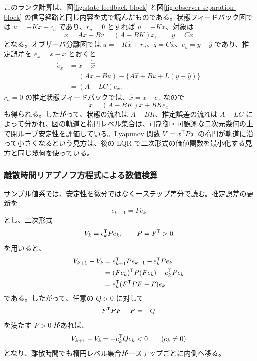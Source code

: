 このランク計算は、図\ref{fig:state-feedback-block} と図\ref{fig:observer-separation-block} の信号経路と同じ内容を式で読んだものである。状態フィードバック図では $u=-Kx+r_u$ であり、$r_u=0$ とすれば $u=-Kx$、対象は
\begin{equation}
  \dot{x}=Ax+Bu=(A-BK)x,\qquad y=Cx
\end{equation}
となる。オブザーバ分離図では $u=-K\hat{x}+r_u$、$\hat{y}=C\hat{x}$、$e_y=y-\hat{y}$ であり、推定誤差を $e_x=x-\hat{x}$ とおくと
\begin{align}
  \dot{e}_x
  &=\dot{x}-\dot{\hat{x}}\\
  &=(Ax+Bu)-\{A\hat{x}+Bu+L(y-\hat{y})\}\\
  &=(A-LC)e_x.
\end{align}
$r_u=0$ の推定状態フィードバックでは、$\hat{x}=x-e_x$ なので
\begin{equation}
  \dot{x}=(A-BK)x+BK e_x
\end{equation}
も得られる。したがって、状態の流れは $A-BK$、推定誤差の流れは $A-LC$ によって分かれ、図の軌道と楕円レベル集合は、可制御・可観測な二次元幾何の上で閉ループ安定性を評価している。Lyapunov 関数 $V=x^{\mathsf{T}} Px$ の楕円が軌道に沿って小さくなるという見方は、後の LQR で二次形式の価値関数を最小化する見方と同じ幾何を使っている。

\subsubsection{離散時間リアプノフ方程式による数値検算}

サンプル値系では、安定性を微分ではなく一ステップ差分で読む。推定誤差の更新を
\begin{equation}
  e_{k+1}=F e_k
\end{equation}
とし、二次形式
\begin{equation}
  V_k=e_k^{\mathsf{T}} P e_k,\qquad P=P^{\mathsf{T}}>0
\end{equation}
を用いると、
\begin{align}
  V_{k+1}-V_k
  &=e_{k+1}^{\mathsf{T}} P e_{k+1}-e_k^{\mathsf{T}} P e_k\\
  &=(F e_k)^{\mathsf{T}} P(F e_k)-e_k^{\mathsf{T}} P e_k\\
  &=e_k^{\mathsf{T}}(F^{\mathsf{T}} P F-P)e_k
\end{align}
である。したがって、任意の $Q>0$ に対して
\begin{equation}
  F^{\mathsf{T}} P F-P=-Q
\end{equation}
を満たす $P>0$ があれば、
\begin{equation}
  V_{k+1}-V_k=-e_k^{\mathsf{T}} Qe_k<0\qquad(e_k\ne0)
\end{equation}
となり、離散時間でも楕円レベル集合が一ステップごとに内側へ移る。

